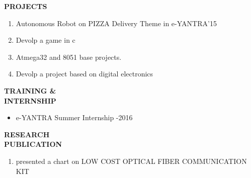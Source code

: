 \documentclass{article}
\begin{document}
 \begin{flushleft} 
 	\vspace{0.2in}
 	\textbf{PROJECTS}
 	\begin{enumerate}
 		\vspace{-0.29in}
 		\addtolength{\itemindent}{1.359in}
 		\item  Autonomous Robot on PIZZA Delivery Theme in e-YANTRA'15
 		\item  Devolp a game in c
 		\item  Atmega32 and 8051 base projects.
 		\item Devolp a project based on digital electronics
 	\end{enumerate}
 \end{flushleft} 
 
  \begin{flushleft} 
  	\vspace{0.4in}
  	\textbf{TRAINING \& \\ INTERNSHIP}
  	\begin{itemize}
  		\vspace{-0.44in}
  		\addtolength{\itemindent}{1.359in}
  		\item  e-YANTRA Summer Internship -2016
  	\end{itemize}
  \end{flushleft}
  
  \begin{flushleft} 
  	\vspace{0.4in}
  	\textbf{RESEARCH \\ PUBLICATION}
  	\begin{enumerate}
  		\vspace{-0.45in}
  		\addtolength{\itemindent}{1.359in}
  		\item  presented a chart on LOW COST OPTICAL FIBER COMMUNICATION KIT
  	\end{enumerate}
  \end{flushleft}
  
\end{document}
